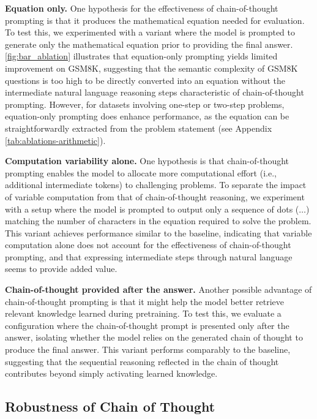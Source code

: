 \textbf{Equation only.} One hypothesis for the effectiveness of chain-of-thought prompting is that it produces the mathematical equation needed for evaluation. To test this, we experimented with a variant where the model is prompted to generate only the mathematical equation prior to providing the final answer. \cref{fig:bar_ablation} illustrates that equation-only prompting yields limited improvement on GSM8K, suggesting that the semantic complexity of GSM8K questions is too high to be directly converted into an equation without the intermediate natural language reasoning steps characteristic of chain-of-thought prompting. However, for datasets involving one-step or two-step problems, equation-only prompting does enhance performance, as the equation can be straightforwardly extracted from the problem statement (see Appendix \cref{tab:ablations-arithmetic}).


\textbf{Computation variability alone.} One hypothesis is that chain-of-thought prompting enables the model to allocate more computational effort (i.e., additional intermediate tokens) to challenging problems. To separate the impact of variable computation from that of chain-of-thought reasoning, we experiment with a setup where the model is prompted to output only a sequence of dots ($\ldots$) matching the number of characters in the equation required to solve the problem. This variant achieves performance similar to the baseline, indicating that variable computation alone does not account for the effectiveness of chain-of-thought prompting, and that expressing intermediate steps through natural language seems to provide added value.

\textbf{Chain-of-thought provided after the answer.} Another possible advantage of chain-of-thought prompting is that it might help the model better retrieve relevant knowledge learned during pretraining. To test this, we evaluate a configuration where the chain-of-thought prompt is presented only after the answer, isolating whether the model relies on the generated chain of thought to produce the final answer. This variant performs comparably to the baseline, suggesting that the sequential reasoning reflected in the chain of thought contributes beyond simply activating learned knowledge.


\subsection{Robustness of Chain of Thought}\label{subsec:robustness}

